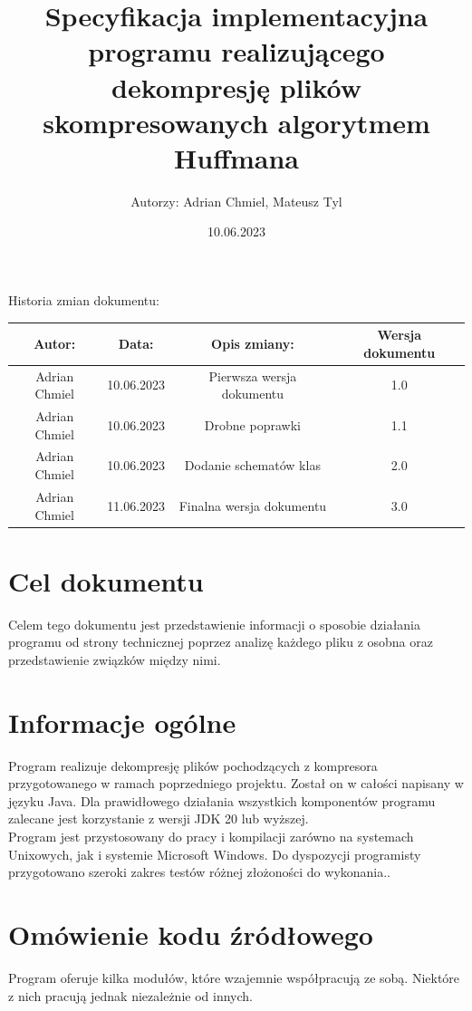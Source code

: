 \documentclass[]{article}
\title{Specyfikacja implementacyjna programu realizującego dekompresję plików skompresowanych algorytmem Huffmana}
\author{Autorzy: Adrian Chmiel, Mateusz Tyl}
\date{10.06.2023}
\begin{document}
\maketitle
\begin{center}
Historia zmian dokumentu:\\
\end{center}

\begin{tabular}{|c|c|c|c|}
  \hline 
  Autor: & Data: & Opis zmiany:& Wersja dokumentu \\
  \hline
  Adrian Chmiel & 10.06.2023 & Pierwsza wersja dokumentu & 1.0 \\
  \hline
  Adrian Chmiel & 10.06.2023 & Drobne poprawki & 1.1 \\
  \hline
  Adrian Chmiel & 10.06.2023 & Dodanie schematów klas & 2.0 \\
  \hline
  Adrian Chmiel & 11.06.2023 & Finalna wersja dokumentu & 3.0 \\
\hline
\end{tabular} 
\section{Cel dokumentu}\label{header-n231}

Celem tego dokumentu jest przedstawienie informacji o sposobie działania programu od strony technicznej poprzez analizę każdego pliku z osobna oraz przedstawienie związków między nimi.
\section{Informacje ogólne}\label{header-n231}
Program realizuje dekompresję plików pochodzących z kompresora przygotowanego w ramach poprzedniego projektu. Został on w całości napisany w języku Java. Dla prawidłowego działania wszystkich komponentów programu zalecane jest korzystanie z wersji JDK 20 lub wyższej.\\
Program jest przystosowany do pracy i kompilacji zarówno na systemach Unixowych, jak i systemie Microsoft Windows. Do dyspozycji programisty przygotowano szeroki zakres testów różnej złożoności do wykonania..

\section{Omówienie kodu źródłowego}\label{header-n231}
Program oferuje kilka modułów, które wzajemnie współpracują ze sobą. Niektóre z nich pracują jednak niezależnie od innych.
\end{document}
